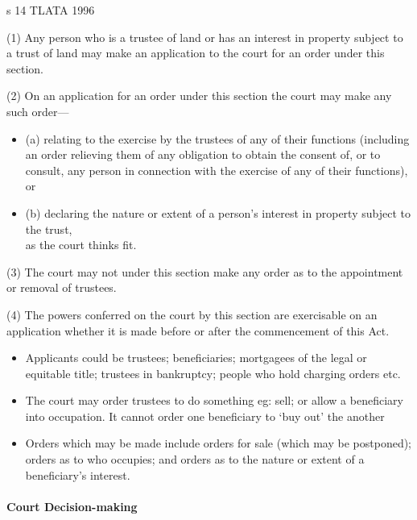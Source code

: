 \documentclass[
]{article}
\providecommand{\tightlist}{%
  \setlength{\itemsep}{0pt}\setlength{\parskip}{0pt}}
\newenvironment{env-9843ce55-0506-497d-95ba-03a690b05b3c}
{
    \savenotes\tcolorbox[blanker,breakable,left=5pt,borderline west={2pt}{-4pt}{green}]
}
{
    \endtcolorbox\spewnotes
}
\begin{document}
\begin{env-9843ce55-0506-497d-95ba-03a690b05b3c}

s 14 TLATA 1996

(1) Any person who is a trustee of land or has an interest in property
subject to a trust of land may make an application to the court for an
order under this section.

(2) On an application for an order under this section the court may make
any such order---

\begin{itemize}
\tightlist
\item
  (a) relating to the exercise by the trustees of any of their functions
  (including an order relieving them of any obligation to obtain the
  consent of, or to consult, any person in connection with the exercise
  of any of their functions), or
\item
  (b) declaring the nature or extent of a person's interest in property
  subject to the trust,\\
  as the court thinks fit.
\end{itemize}

(3) The court may not under this section make any order as to the
appointment or removal of trustees.

(4) The powers conferred on the court by this section are exercisable on
an application whether it is made before or after the commencement of
this Act.

\end{env-9843ce55-0506-497d-95ba-03a690b05b3c}

\begin{itemize}
\tightlist
\item
  Applicants could be trustees; beneficiaries; mortgagees of the legal
  or equitable title; trustees in bankruptcy; people who hold charging
  orders etc.
\item
  The court may order trustees to do something eg: sell; or allow a
  beneficiary into occupation. It cannot order one beneficiary to `buy
  out' the another
\item
  Orders which may be made include orders for sale (which may be
  postponed); orders as to who occupies; and orders as to the nature or
  extent of a beneficiary's interest.
\end{itemize}

\hypertarget{court-decision-making}{%
\paragraph{Court Decision-making}\label{court-decision-making}}
\end{document}
